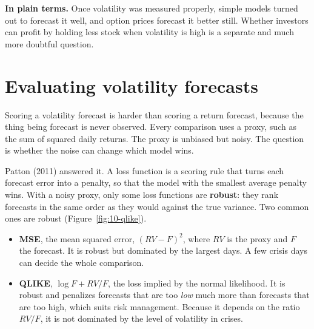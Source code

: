 \noindent\textbf{In plain terms.} Once volatility was measured properly, simple models turned out to forecast it well, and option prices forecast it better still. Whether investors can profit by holding less stock when volatility is high is a separate and much more doubtful question.

\section{Evaluating volatility forecasts}
\label{sec:10-eval}

Scoring a volatility forecast is harder than scoring a return forecast, because the thing being forecast is never observed. Every comparison uses a proxy, such as the sum of squared daily returns. The proxy is unbiased but noisy. The question is whether the noise can change which model wins.

Patton (2011) answered it. A loss function is a scoring rule that turns each forecast error into a penalty, so that the model with the smallest average penalty wins. With a noisy proxy, only some loss functions are \textbf{robust}: they rank forecasts in the same order as they would against the true variance. Two common ones are robust (Figure~\ref{fig:10-qlike}).

\begin{itemize}
  \item \textbf{MSE}, the mean squared error, $(RV - F)^2$, where $RV$ is the proxy and $F$ the forecast. It is robust but dominated by the largest days. A few crisis days can decide the whole comparison.
  \item \textbf{QLIKE}, $\log F + RV/F$, the loss implied by the normal likelihood. It is robust and penalizes forecasts that are too \emph{low} much more than forecasts that are too high, which suits risk management. Because it depends on the ratio $RV/F$, it is not dominated by the level of volatility in crises.
\end{itemize}

